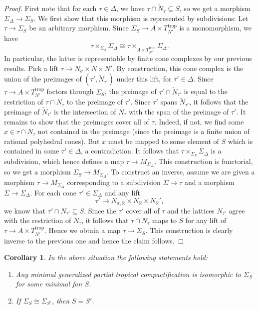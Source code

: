 \documentclass[11pt]{amsart}
\newtheorem{corollary}[theorem]{Corollary}
\theoremstyle{definition}
\theoremstyle{remark}
\def\trop{\mathrm{trop}}
\begin{document}
\begin{proof}
	First note that for each $\tau\in \Delta$, we have $\tau\cap \tilde{N}_{\tau}\subseteq S$,
	so we get a morphism $\Sigma_{\Delta}\to \Sigma_S$. We first show that this morphism is represented
	by subdivisions: Let $\tau\to \Sigma_S$ be an arbitrary morphism. Since $\Sigma_S\to A\times T_{N'}^{\trop}$
	is a monomorphism, we have
	$$\tau\times_{\Sigma_S}\Sigma_{\Delta}\cong \tau\times_{A\times T_{N'}^{\trop}} \Sigma_{\Delta}.$$
	In particular, the latter is representable by finite cone complexes by our previous results.
	Pick a lift $\tau\to N_{\sigma}\times N\times N'$. By
	construction, this cone complex is the union of the preimages of $(\tau',\tilde{N}_{\tau'})$
	under this lift, for $\tau'\in \Delta$. Since $\tau\to A\times T_{N'}^{\trop}$ factors through
	$\Sigma_S$, the preimage of $\tau'\cap \tilde{N}_{\tau'}$ is equal to the restriction
	of $\tau\cap N_{\tau}$ to the preimage of $\tau'$. Since $\tau'$ spans $\tilde{N}_{\tau'}$, it follows that
	the preimage of $\tilde{N}_{\tau'}$ is the intersection of $N_{\tau}$ with the span of the preimage of
	$\tau'$. It remains to show that the preimages cover all of $\tau$. Indeed,
	if not, we find some $x\in \tau\cap N_{\tau}$ not contained in the preimage (since the preimage
	is a finite union of rational polyhedral cones). But $x$ must be mapped to some element of $S$ which is contained
	in some $\tau'\in \Delta$, a contradiction. It follows that $\tau\times_{\Sigma_S}\Sigma_{\Delta}$
	is a subdivision, which hence defines a map $\tau\to M_{\Sigma_{\Delta}}$. This construction is
	functorial, so we get a morphism $\Sigma_{S}\to M_{\Sigma_{\Delta}}$. To construct an inverse,
	assume we are given a morphism $\tau\to M_{\Sigma_{\Delta}}$ corresponding to a subdivision
	$\Sigma\to \tau$ and a morphism $\Sigma\to \Sigma_{\Delta}$. For each cone $\tau'\in\Sigma_{\Delta}$
	and any lift
	$$\tau'\to N_{\sigma,\mathbb{R}}\times N_{\mathbb{R}}\times N_{\mathbb{R}}',$$
	we know that $\tau'\cap N_{\tau'}\subseteq S$.
	Since the $\tau'$ cover all of $\tau$ and the lattices $N_{\tau'}$ agree with the restriction of $N_{\tau}$,
	it follows that $\tau\cap N_{\tau}$ maps to $S$ for any lift of $\tau\to A\times T_{N'}^{\trop}$.
	Hence we obtain a map $\tau\to \Sigma_S$. This construction is clearly inverse to the previous
	one and hence the claim follows.
\end{proof}

\begin{corollary}
	\label{cor:combinat_descr_min}
	In the above situation the following statements hold:
\begin{enumerate}
	\item Any minimal generalized partial tropical compactification is isomorphic to $\Sigma_{S}$ for some minimal fan $S$.
	\item If $\Sigma_{S}\cong \Sigma_{S'}$, then $S=S'$.
\end{enumerate}
\end{corollary}
\end{document}
